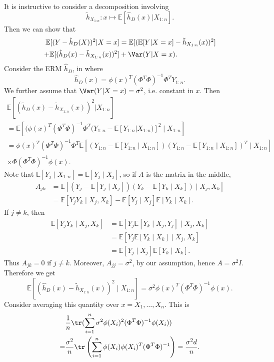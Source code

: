 \documentclass[12pt]{article}
\begin{document}
It is instructive to consider a decomposition involving 
\[
\tilde h_{X_{1:n}} : x \mapsto \mathbb{E}[\hat h_D(x) | X_{1:n}].
\]
Then we can show that
\begin{align*}
	\mathbb{E}[(Y - \hat h_D(X))^2 | X = x] &= \mathbb{E}[(\mathbb{E}[Y|X = x]  - \tilde h_{X_{1:n}}(x))^2] \\
	+ \mathbb{E}[(\hat h_D(x) - \tilde h_{X_{1:n}}(x))^2] &+ \Var(Y | X = x).
\end{align*}
Consider the ERM $\hat h_D$, in where
\[
\hat h_D(x) = \phi(x)^{T}(\Phi^{T}\Phi)^{-1}\Phi^{T} Y_{1:n}.
\]
We further assume that $\Var(Y | X = x) = \sigma^2$, i.e. constant in $x$. Then
\begin{align*}
	\mathbb{E}[(\tilde h_D(x) - \tilde h_{X_{1:n}}(x))^2 | X_{1:n}] \\
	= \mathbb{E}[(\phi(x)^T (\Phi^T\Phi)^{-1}\Phi^T(Y_{1:n} - \mathbb{E}[Y_{1:n}|X_{1:n})]^2 \mid X_{1:n}] \\
	= \phi(x)^T(\Phi^T \Phi)^{-1} \Phi^T \mathbb{E}[(Y_{1:n} - \mathbb{E}[Y_{1:n} \mid X_{1:n}])(Y_{1:n} - \mathbb{E}[Y_{1:n}\mid X_{1:n}])^{T} \mid X_{1:n}] \\
	\times \Phi(\Phi^T \Phi)^{-1} \phi(x).
\end{align*}
Note that $\mathbb{E}[Y_j \mid X_{1:n}] = \mathbb{E}[Y_j \mid X_j]$, so if $A$ is the matrix in the middle,
\begin{align*}
	A_{jk} &= \mathbb{E}[(Y_j - \mathbb{E}[Y_j \mid X_j])(Y_k - \mathbb{E}[Y_k \mid X_k]) \mid X_j, X_k] \\
	       &= \mathbb{E}[Y_j Y_k \mid X_j, X_k] - \mathbb{E}[Y_j \mid X_j] \mathbb{E}[Y_k \mid X_k].
\end{align*}
If $j \neq k$, then
\begin{align*}
	\mathbb{E}[Y_j Y_k \mid X_j, X_k] &= \mathbb{E}[Y_j \mathbb{E}[Y_k \mid X_j, Y_j] \mid X_j, X_k] \\
					  &= \mathbb{E}[Y_j \mathbb{E}[Y_k \mid X_k] \mid X_j, X_k] \\
					  &= \mathbb{E}[Y_j \mid X_j] \mathbb{E}[Y_k \mid X_k].
\end{align*}
Thus $A_{jk} = 0$ if $j \neq k$. Moreover, $A_{jj} = \sigma^2$, by our assumption, hence $A = \sigma^2I$. Therefore we get
\[
\mathbb{E}[(\hat h_D(x) - \tilde h_{X_{1:n}}(x))^2 \mid X_{1:n}] = \sigma^2 \phi(x)^T (\Phi^T \Phi)^{-1} \phi(x).
\]
Consider averaging this quantity over $x = X_1, \ldots, X_n$. This is
\begin{align*}
	&\frac{1}{n} \tr ( \sum_{i = 1}^n \sigma^2 \phi(X_i)^2 (\Phi^T \Phi)^{-1} \phi(X_i)) \\
	= &\frac{\sigma^2}{n} \tr \left( \sum_{i = 1}^n \phi(X_i) \phi(X_i)^T (\Phi^{T}\Phi)^{-1} \right) = \frac{\sigma^2 d}{n}.
\end{align*}
\end{document}
